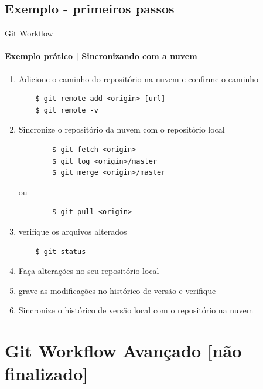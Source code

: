 \documentclass[xcolor=dvipsnames,t]{beamer}
\begin{document}
\subsection{Exemplo - primeiros passos}
\begin{frame}[fragile]{Git Workflow}
\framesubtitle{Exemplo prático | Sincronizando com a nuvem}

\begin{enumerate}
	\item Adicione o caminho do repositório na nuvem e confirme o caminho
	\begin{verbatim}
	$ git remote add <origin> [url]
	$ git remote -v
	\end{verbatim}
	
	\item Sincronize o repositório da nuvem com o repositório local
	\begin{verbatim}
		$ git fetch <origin>
		$ git log <origin>/master
		$ git merge <origin>/master
	\end{verbatim}
	ou 
	\begin{verbatim}
		$ git pull <origin>
	\end{verbatim}
	\item verifique os arquivos alterados		
	\begin{verbatim}
	$ git status 
	\end{verbatim}
	
	\item Faça alterações no seu repositório local
	\item grave as modificações no histórico de versão e verifique
	\item Sincronize o histórico de versão local com o repositório na nuvem
	
\end{enumerate}

\end{frame}

\section{Git Workflow Avançado [não finalizado]}

\begin{frame}{}
\tiny
\tableofcontents[current]
\end{frame}
\end{document}
